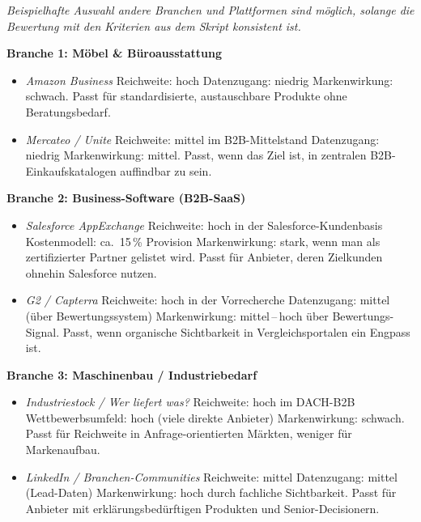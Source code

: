 \documentclass[11pt,a4paper,oneside]{article}
\begin{document}
\begin{loesungbox}
\emph{Beispielhafte Auswahl \textendash{} andere Branchen und Plattformen sind möglich, solange die Bewertung mit den Kriterien aus dem Skript konsistent ist.}

\smallskip
\textbf{Branche 1: Möbel \& Büroausstattung}
\begin{itemize}
  \item \emph{Amazon Business} \textendash{} Reichweite: hoch \textperiodcentered{} Datenzugang: niedrig \textperiodcentered{} Markenwirkung: schwach. Passt für standardisierte, austauschbare Produkte ohne Beratungsbedarf.
  \item \emph{Mercateo / Unite} \textendash{} Reichweite: mittel im B2B-Mittelstand \textperiodcentered{} Datenzugang: niedrig \textperiodcentered{} Markenwirkung: mittel. Passt, wenn das Ziel ist, in zentralen B2B-Einkaufskatalogen auffindbar zu sein.
\end{itemize}

\textbf{Branche 2: Business-Software (B2B-SaaS)}
\begin{itemize}
  \item \emph{Salesforce AppExchange} \textendash{} Reichweite: hoch in der Salesforce-Kundenbasis \textperiodcentered{} Kostenmodell: ca.\ 15\,\% Provision \textperiodcentered{} Markenwirkung: stark, wenn man als zertifizierter Partner gelistet wird. Passt für Anbieter, deren Zielkunden ohnehin Salesforce nutzen.
  \item \emph{G2 / Capterra} \textendash{} Reichweite: hoch in der Vorrecherche \textperiodcentered{} Datenzugang: mittel (über Bewertungssystem) \textperiodcentered{} Markenwirkung: mittel\,--\,hoch über Bewertungs-Signal. Passt, wenn organische Sichtbarkeit in Vergleichsportalen ein Engpass ist.
\end{itemize}

\textbf{Branche 3: Maschinenbau / Industriebedarf}
\begin{itemize}
  \item \emph{Industriestock / Wer liefert was?} \textendash{} Reichweite: hoch im DACH-B2B \textperiodcentered{} Wettbewerbsumfeld: hoch (viele direkte Anbieter) \textperiodcentered{} Markenwirkung: schwach. Passt für Reichweite in Anfrage-orientierten Märkten, weniger für Markenaufbau.
  \item \emph{LinkedIn / Branchen-Communities} \textendash{} Reichweite: mittel \textperiodcentered{} Datenzugang: mittel (Lead-Daten) \textperiodcentered{} Markenwirkung: hoch durch fachliche Sichtbarkeit. Passt für Anbieter mit erklärungsbedürftigen Produkten und Senior-Decisionern.
\end{itemize}
\end{loesungbox}
\end{document}
